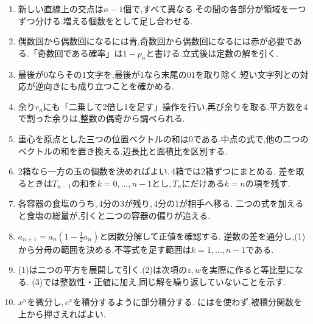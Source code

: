         \begin{enumerate}[label=\textbf{問\arabic*.},leftmargin=3.8em,format=\bookitemlink{practice-bridge}{hint}{problem}]
          \item 新しい直線上の交点は$\displaystyle n-1$個で,すべて異なる.その間の各部分が領域を一つずつ分ける.増える個数をとして足し合わせる.
          \item 偶数回から偶数回になるには青,奇数回から偶数回になるには赤が必要である.「奇数回である確率」は$\displaystyle 1-p_n$と書ける.立式後は定数の解を引く.
          \item 最後が$\displaystyle 0$ならその1文字を,最後が$\displaystyle 1$なら末尾の$\displaystyle 01$を取り除く.短い文字列との対応が逆向きにも成り立つことを確かめる.
          \item 余り$\displaystyle r_n$にも「二乗して2倍し1を足す」操作を行い,再び余りを取る.平方数を$\displaystyle 4$で割った余りは,整数の偶奇から調べられる.
          \item 重心を原点とした三つの位置ベクトルの和は$\displaystyle 0$である.中点の式で,他の二つのベクトルの和を置き換える.辺長比と面積比を区別する.
          \item 2箱なら一方の玉の個数を決めればよい.\,4箱では2箱ずつにまとめる.
                差を取るときは$\displaystyle T_{n-1}$の和を$\displaystyle k=0,\ldots,n-1$とし,\,$\displaystyle T_n$にだけある$\displaystyle k=n$の項を残す.
          \item 各容器の食塩のうち,\,4分の3が残り,\,4分の1が相手へ移る.
                二つの式を加えると食塩の総量が,引くと二つの容器の偏りが追える.
          \item $\displaystyle a_{n+1}=a_n(1-\frac12a_n)$と因数分解して正値を確認する.
                逆数の差を通分し,(1)から分母の範囲を決める.不等式を足す範囲は$\displaystyle k=1,\ldots,n-1$である.
          \item (1)は二つの平方を展開して引く.(2)は次項の$\displaystyle z,w$を実際に作ると等比型になる.
                (3)では整数性・正値に加え,同じ解を繰り返していないことを示す.
          \item $\displaystyle x^n$を微分し,\,$\displaystyle e^x$を積分するように部分積分する.
                にはを使わず,被積分関数を上から押さえればよい.
        \end{enumerate}

